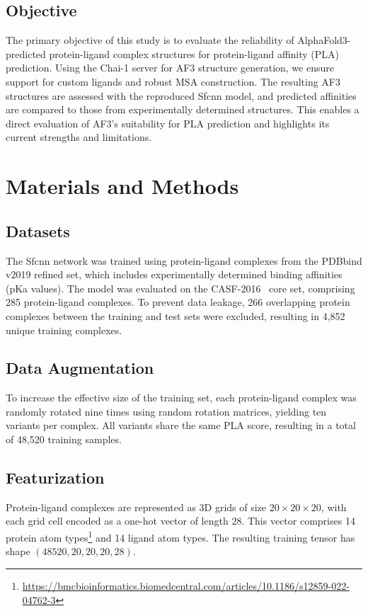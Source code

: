 \documentclass[unnumsec,webpdf,contemporary,large]{oup-authoring-template}
\theoremstyle{thmstyleone}%
\theoremstyle{thmstyletwo}%
\theoremstyle{thmstylethree}%
\begin{document}
\subsection{Objective}
The primary objective of this study is to evaluate the reliability of AlphaFold3-predicted protein-ligand complex structures for protein-ligand affinity (PLA) prediction. Using the Chai-1 server for AF3 structure generation, we ensure support for custom ligands and robust MSA construction. The resulting AF3 structures are assessed with the reproduced Sfcnn model, and predicted affinities are compared to those from experimentally determined structures. This enables a direct evaluation of AF3's suitability for PLA prediction and highlights its current strengths and limitations.

\section{Materials and Methods}
\vspace{0.5em}
\subsection{Datasets}
The Sfcnn network was trained using protein-ligand complexes from the PDBbind v2019 refined set\cite{Wang2005PDBbind}, which includes experimentally determined binding affinities (pKa values). The model was evaluated on the CASF-2016~\cite{su2018comparative} core set, comprising 285 protein-ligand complexes. To prevent data leakage, 266 overlapping protein complexes between the training and test sets were excluded, resulting in 4,852 unique training complexes.

\subsection{Data Augmentation}
To increase the effective size of the training set, each protein-ligand complex was randomly rotated nine times using random rotation matrices, yielding ten variants per complex. All variants share the same PLA score, resulting in a total of 48,520 training samples.

\subsection{Featurization}
Protein-ligand complexes are represented as 3D grids of size $20 \times 20 \times 20$, with each grid cell encoded as a one-hot vector of length 28. This vector comprises 14 protein atom types\footnote{\url{https://bmcbioinformatics.biomedcentral.com/articles/10.1186/s12859-022-04762-3}} and 14 ligand atom types. The resulting training tensor has shape $(48520, 20, 20, 20, 28)$.
\end{document}
